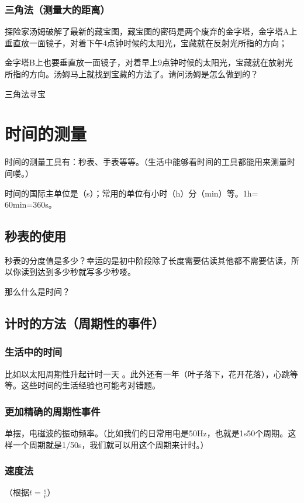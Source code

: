 \documentclass[12pt]{exam}%
\begin{document}
\begin{knowledge}
\subsubsection{三角法（测量大的距离）}
探险家汤姆破解了最新的藏宝图，藏宝图的密码是两个废弃的金字塔，金字塔A上垂直放一面镜子，对着下午4点钟时候的太阳光，宝藏就在反射光所指的方向；

金字塔B上也要垂直放一面镜子，对着早上9点钟时候的太阳光，宝藏就在放射光所指的方向。汤姆马上就找到宝藏的方法了。请问汤姆是怎么做到的？

\begin{fig}[0.8]{三角法寻宝}
\end{fig}


\section{时间的测量}
时间的测量工具有：秒表、手表等等。（生活中能够看时间的工具都能用来测量时间喽。）

时间的国际主单位是\answerline*[秒]（s）；常用的单位有小时（h）分（min）等。1h= 60min=360s。


\subsection{秒表的使用}
秒表的分度值是多少？幸运的是初中阶段除了长度需要估读其他都不需要估读，所以你读到达到多少秒就写多少秒喽。

那么什么是时间？

\subsection{计时的方法（周期性的事件）}
\subsubsection{生活中的时间}
比如以太阳周期性升起计时一天  。此外还有一年（叶子落下，花开花落），心跳等等。这些时间的生活经验也可能考对错题。


\subsubsection{更加精确的周期性事件}
单摆，电磁波的振动频率。（比如我们的日常用电是50Hz，也就是1s50个周期。这样一个周期就是1/50s，我们就可以用这个周期来计时。）


\subsubsection{速度法}
（根据$t=\frac{s}{v}$）



\end{knowledge}
\end{document}
